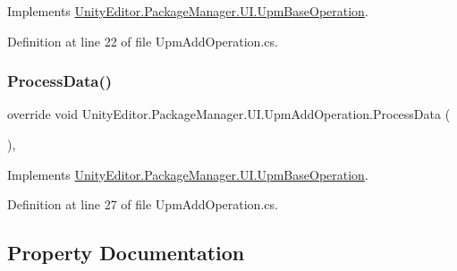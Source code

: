 Implements \mbox{\hyperlink{class_unity_editor_1_1_package_manager_1_1_u_i_1_1_upm_base_operation_ae4b93c7bf7b6eb994082e78cb146f793}{Unity\+Editor.\+Package\+Manager.\+U\+I.\+Upm\+Base\+Operation}}.



Definition at line 22 of file Upm\+Add\+Operation.\+cs.

\mbox{\label{class_unity_editor_1_1_package_manager_1_1_u_i_1_1_upm_add_operation_afcf098692ff87d8f0b657a5c52e165b2}} 
\subsubsection{\texorpdfstring{ProcessData()}{ProcessData()}}
{\footnotesize\ttfamily override void Unity\+Editor.\+Package\+Manager.\+U\+I.\+Upm\+Add\+Operation.\+Process\+Data (\begin{DoxyParamCaption}{ }\end{DoxyParamCaption})\hspace{0.3cm}{\ttfamily [protected]}, {\ttfamily [virtual]}}



Implements \mbox{\hyperlink{class_unity_editor_1_1_package_manager_1_1_u_i_1_1_upm_base_operation_a5a4730e21b4cea1052e494cc5ca0eb84}{Unity\+Editor.\+Package\+Manager.\+U\+I.\+Upm\+Base\+Operation}}.



Definition at line 27 of file Upm\+Add\+Operation.\+cs.



\subsection{Property Documentation}
\mbox{\label{class_unity_editor_1_1_package_manager_1_1_u_i_1_1_upm_add_operation_a9ea676c65a0212e075b541ee3fd64c70}} 
